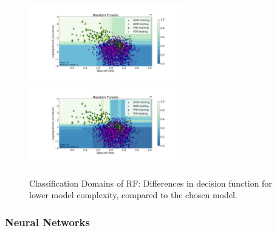 \begin{figure}[h]
\hspace*{-1.5cm}
\includegraphics[width=0.6\textwidth]{plots/classification_domains/rf_20_2_final.pdf}
\hspace*{-1.5cm}
\includegraphics[width=0.6\textwidth]{plots/classification_domains/rf_50_6_final.pdf}
\caption{Classification Domains of RF: Differences in decision function for lower model complexity, compared to the chosen model.}  
\label{fig:RF_domains}
\end{figure}



\subsubsection{Neural Networks}

